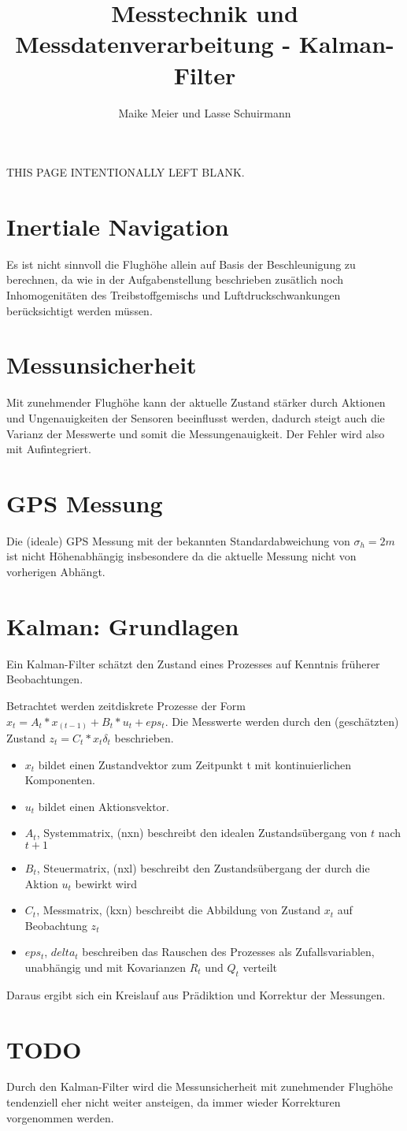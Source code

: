 \documentclass[12pt,a4paper]{article}
\author{Maike Meier und Lasse Schuirmann}
\title{Messtechnik und Messdatenverarbeitung - Kalman-Filter}
\newcommand*{\blankpage}{
  \vspace*{\fill}
  \begin{flushright}
  \tiny THIS PAGE INTENTIONALLY LEFT BLANK.
  \end{flushright}
  \pagebreak
}
\begin{document}

\maketitle
\pagebreak

\blankpage

\section{Inertiale Navigation}
Es ist nicht sinnvoll die Flughöhe allein auf Basis der Beschleunigung zu berechnen, da wie in der Aufgabenstellung beschrieben zusätlich noch Inhomogenitäten des Treibstoffgemischs und Luftdruckschwankungen berücksichtigt werden müssen.

\section{Messunsicherheit}
Mit zunehmender Flughöhe kann der aktuelle Zustand stärker durch Aktionen und 
Ungenauigkeiten der Sensoren beeinflusst werden, dadurch steigt auch die 
Varianz der Messwerte und somit die Messungenauigkeit. Der Fehler wird also mit Aufintegriert.

\section{GPS Messung}
Die (ideale) GPS Messung mit der bekannten Standardabweichung von $\sigma_h = 2m$ ist nicht Höhenabhängig insbesondere da die aktuelle Messung nicht von vorherigen Abhängt.

\section{Kalman: Grundlagen}
Ein Kalman-Filter schätzt den Zustand eines Prozesses auf Kenntnis früherer Beobachtungen.

Betrachtet werden zeitdiskrete Prozesse der Form $x_t = A_t * x_(t-1) + B_t *u_t + eps_t$. Die Messwerte werden durch den (geschätzten) Zustand $z_t = C_t * x_t  \delta_t$ beschrieben.

\begin{itemize}
\item $x_t$ bildet einen Zustandvektor zum Zeitpunkt t mit kontinuierlichen Komponenten.
\item $u_t$ bildet einen Aktionsvektor.
\item $A_t$, Systemmatrix, (nxn) beschreibt den idealen Zustandsübergang von $t$ nach $t+1$
\item $B_t$, Steuermatrix, (nxl) beschreibt den Zustandsübergang der durch die Aktion $u_t$ bewirkt wird
\item $C_t$, Messmatrix, (kxn) beschreibt die Abbildung von Zustand $x_t$ auf Beobachtung $z_t$
\item $eps_t$, $delta_t$ beschreiben das Rauschen des Prozesses als Zufallsvariablen, unabhängig und mit
Kovarianzen $R_t$ und $Q_t$ verteilt
\end{itemize}

Daraus ergibt sich ein Kreislauf aus Prädiktion und Korrektur der Messungen.

\section{TODO}
Durch den Kalman-Filter wird die Messunsicherheit mit zunehmender Flughöhe tendenziell eher nicht
weiter ansteigen, da immer wieder Korrekturen vorgenommen werden.
\end{document}
